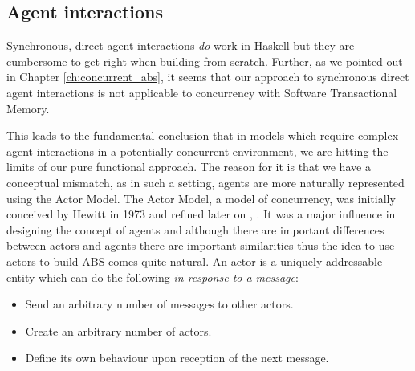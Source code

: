 \subsection{Agent interactions}
Synchronous, direct agent interactions \textit{do} work in Haskell but they are cumbersome to get right when building from scratch. Further, as we pointed out in Chapter \ref{ch:concurrent_abs}, it seems that our approach to synchronous direct agent interactions is not applicable to concurrency with Software Transactional Memory. 

This leads to the fundamental conclusion that in models which require complex agent interactions in a potentially concurrent environment, we are hitting the limits of our pure functional approach. The reason for it is that we have a conceptual mismatch, as in such a setting, agents are more naturally represented using the Actor Model. The Actor Model, a model of concurrency, was initially conceived by Hewitt in 1973 \cite{hewitt_universal_1973} and refined later on \cite{hewitt_what_2007}, \cite{hewitt_actor_2010}. It was a major influence in designing the concept of agents and although there are important differences between actors and agents there are important similarities thus the idea to use actors to build ABS comes quite natural. %
An actor is a uniquely addressable entity which can do the following \textit{in response to a message}:
\begin{itemize}
	\item Send an arbitrary number of messages to other actors.
	\item Create an arbitrary number of actors.
	\item Define its own behaviour upon reception of the next message.
\end{itemize}

